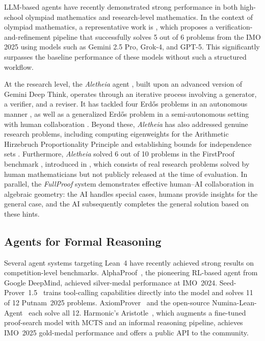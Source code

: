 \documentclass[]{pkuai4m}
\theoremstyle{plain}
\theoremstyle{definition}
\begin{document}
LLM-based agents have recently demonstrated strong performance in both high-school olympiad mathematics and research-level mathematics. In the context of olympiad mathematics, a representative work is \cite{huang2025winning}, which proposes a verification-and-refinement pipeline that successfully solves 5 out of 6 problems from the IMO 2025 using models such as Gemini 2.5 Pro, Grok-4, and GPT-5. This significantly surpasses the baseline performance of these models without such a structured workflow.

At the research level, the \textit{Aletheia} agent \cite{feng2026towards}, built upon an advanced version of Gemini Deep Think, operates through an iterative process involving a generator, a verifier, and a reviser. It has tackled four Erdős problems in an autonomous manner \cite{feng2026semi}, as well as a generalized Erdős problem in a semi-autonomous setting with human collaboration \cite{barreto2026irrationality}. Beyond these, \textit{Aletheia} has also addressed genuine research problems, including computing eigenweights for the Arithmetic Hirzebruch Proportionality Principle \cite{feng2026eigenweights} and establishing bounds for independence sets \cite{lee2026lower}. Furthermore, \textit{Aletheia} solved 6 out of 10 problems in the FirstProof benchmark \cite{feng2026aletheia}, introduced in \cite{abouzaid2026first}, which consists of real research problems solved by human mathematicians but not publicly released at the time of evaluation. In parallel, the \textit{FullProof} system \cite{bryan2026motivic} demonstrates effective human–AI collaboration in algebraic geometry: the AI handles special cases, humans provide insights for the general case, and the AI subsequently completes the general solution based on these hints.

\subsection{Agents for Formal Reasoning}

Several agent systems targeting Lean~4 have recently achieved strong results on competition-level benchmarks. AlphaProof~\cite{hubert2025olympiad}, the pioneering RL-based agent from Google DeepMind, achieved silver-medal performance at IMO~2024. Seed-Prover~1.5~\cite{chen2025seed} trains tool-calling capabilities directly into the model and solves 11 of 12 Putnam~2025 problems. AxiomProver~\cite{breen2025ax} and the open-source Numina-Lean-Agent~\cite{liu2026numina} each solve all 12. Harmonic's Aristotle~\cite{achim2025aristotle}, which augments a fine-tuned proof-search model with MCTS and an informal reasoning pipeline, achieves IMO~2025 gold-medal performance and offers a public API to the community.
\end{document}
